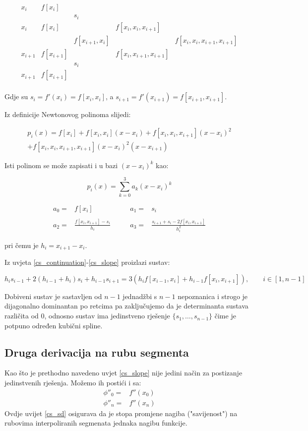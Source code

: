 $$
\begin{array}{ccccc}
    x_i & f[x_i]\\
    & & s_i\\
    x_i&f[x_i] & & f[x_i,x_i,x_{i+1}]\\
    & & f[x_{i+1},x_i] & & f[x_i,x_i,x_{i+1},x_{i+1}]\\
    x_{i+1} & f[x_{i+1}] & & f[x_i,x_{i+1},x_{i+1}]\\
    & & s_i\\
    x_{i+1} & f[x_{i+1}]\\
\end{array}
$$

Gdje su $s_i=f'(x_i)=f[x_i,x_i]$, a $s_{i+1}=f'(x_{i+1})=f[x_{i+1},x_{i+1}]$.

Iz definicije Newtonovog polinoma slijedi:

\begin{gather*}
p_i(x) = f[x_i]+f[x_i,x_i](x-x_i) + f[x_i,x_i,x_{i+1}](x-x_i)^2\\
+f[x_i,x_i,x_{i+1},x_{i+1}](x-x_i)^2(x-x_{i+1})
\end{gather*}

Isti polinom se može zapisati i u bazi $(x-x_i)^k$ kao:

$$
p_i(x)=\sum_{k=0}^3a_k(x-x_i)^k
$$

\begin{align*}
a_0=&f[x_i]&\qquad a_1=&s_i\\\\
a_2=&\frac{f[x_i,x_{i+1}]-s_i}{h_i}&\qquad a_3=&\frac{s_{i+1}+s_i-2f[x_i,x_{i+1}]}{h_i^2}
\end{align*}

pri čemu je $h_i=x_{i+1}-x_i$.

Iz uvjeta \ref{cs_continuation}-\ref{cs_slope} proizlazi sustav:

$$
h_is_{i-1}+2(h_{i-1}+h_i)s_i+h_{i-1}s_{i+1}=3(h_if[x_{i-1},x_i]+h_{i-1}f[x_i,x_{i+1}]),\qquad i\in[1,n-1]
$$

Dobiveni sustav je sastavljen od $n-1$ jednadžbi s $n-1$ nepoznanica i strogo je dijagonalno dominantan po retcima pa zaključujemo da je determinanta sustava različita od 0, odnosno sustav ima jedinstveno rješenje $\{s_1,\dots,s_{n-1}\}$ čime je potpuno određen kubični spline.

\subsection{Druga derivacija na rubu segmenta}

\begin{conditionbox}
    Kao što je prethodno navedeno uvjet \ref{cs_slope} nije jedini način za postizanje jedinstvenih rješenja. Možemo ih postići i sa:
    \begin{align}
        \phi''_0=&f''(x_0)\nonumber\\
        \label{cs_sd}
        \phi''_n=&f''(x_n)
    \end{align}
    Ovdje uvijet \ref{cs_sd} osigurava da je stopa promjene nagiba ("savijenost") na rubovima interpoliranih segmenata jednaka nagibu funkcije.
\end{conditionbox}

